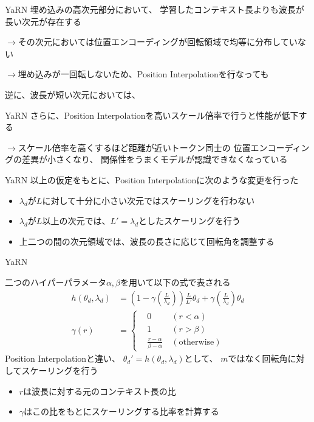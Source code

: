 \documentclass[dvipdfm, aspectratio=169]{beamer}
\begin{document}
    \begin{frame}{YaRN}
        埋め込みの高次元部分において、
        学習したコンテキスト長よりも波長が長い次元が存在する

        $\rightarrow$その次元においては位置エンコーディングが回転領域で均等に分布していない

        $\rightarrow$埋め込みが一回転しないため、Position Interpolationを行なっても

        逆に、波長が短い次元においては、
    \end{frame}
    \begin{frame}{YaRN}
        さらに、Position Interpolationを高いスケール倍率で行うと性能が低下する

        $\rightarrow$スケール倍率を高くするほど距離が近いトークン同士の
        位置エンコーディングの差異が小さくなり、
        関係性をうまくモデルが認識できなくなっている
    \end{frame}
    \begin{frame}{YaRN}
        以上の仮定をもとに、Position Interpolationに次のような変更を行った
        \begin{itemize}
            \item $\lambda_d$が$L$に対して十分に小さい次元ではスケーリングを行わない
            \item $\lambda_d$が$L$以上の次元では、$L'=\lambda_d$としたスケーリングを行う
            \item 上二つの間の次元領域では、波長の長さに応じて回転角を調整する
        \end{itemize}
    \end{frame}
    \begin{frame}{YaRN}
        \begin{block}{}
            二つのハイパーパラメータ$\alpha,\beta$を用いて以下の式で表される
            \begin{align*}h(\theta_d, \lambda_d) &= \left(1-\gamma\left(\frac{L}{\lambda_d}\right)\right)\frac{L}{L'}\theta_d + \gamma\left(\frac{L}{\lambda_d}\right)\theta_d \\
                \gamma(r) &= \left\{ \begin{aligned}
                    &0 \ &(r < \alpha) \\
                    &1 \ &(r > \beta) \\
                    &\frac{r-\alpha}{\beta-\alpha} \ &(\mathrm{otherwise})
                \end{aligned}\right.
            \end{align*}
            Position Interpolationと違い、
            $\theta_d'=h(\theta_d,\lambda_d)$として、
            $m$ではなく回転角に対してスケーリングを行う
        \end{block}
        \begin{itemize}
            \item $r$は波長に対する元のコンテキスト長の比
            \item $\gamma$はこの比をもとにスケーリングする比率を計算する
        \end{itemize}
    \end{frame}
\end{document}

